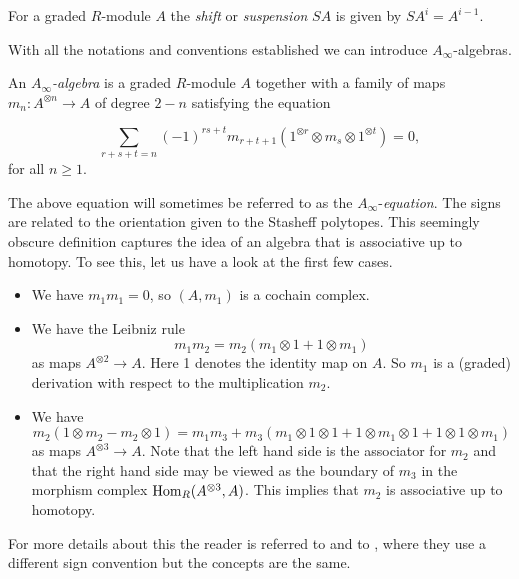\documentclass[Thesis.tex]{subfiles}
\begin{document}
\begin{defin}
For a graded $R$-module $A$ the \emph{shift} or \emph{suspension} $SA$ is given by $SA^i=A^{i-1}$. %
\end{defin}

With all the notations and conventions established we can introduce $A_\infty$-algebras. 

\begin{defin}\label{ainftyalgebra}
An \emph{$A_\infty$-algebra} is a graded $R$-module $A$ together with a family of maps $m_n:A^{\otimes n}\to A$ of degree $2-n$ satisfying the equation

\begin{equation}\label{ainftyequation}
\sum_{r+s+t=n}(-1)^{rs+t}m_{r+t+1}(1^{\otimes r}\otimes m_s\otimes 1^{\otimes t})=0,
\end{equation}
for all $n\geq 1$.
\end{defin}
The above equation will sometimes be referred to as the $A_\infty$-\emph{equation}. The signs are related to the orientation given to the Stasheff polytopes. This seemingly obscure definition captures the idea of an algebra that is associative up to homotopy. To see this, let us have a look at the first few cases.

\begin{itemize}
\item We have $m_1m_1=0$, so $(A, m_1)$ is a cochain complex.
\item We have the Leibniz rule
\[
m_1 m_2 = m_2 (m_1 \otimes 1 + 1 \otimes m_1)
\]
as maps $A^{\otimes 2}\to A$. Here 1 denotes the identity map on $A$. So $m_1$ is
a (graded) derivation with respect to the multiplication $m_2$.
\item We have
\[
m_2(1\otimes m_2 − m_2\otimes 1)= m_1m_3 + m_3 (m_1\otimes 1\otimes 1 + 1\otimes m_1\otimes 1 + 1\otimes 1\otimes m_1)
\]
as maps $A^{\otimes 3}\to A$. Note that the left hand side is the associator for $m_2$ and
that the right hand side may be viewed as the boundary of $m_3$ in the morphism
complex $\operatorname{Hom}_R (A^{\otimes 3},A)$. This implies that $m_2$ is associative up to homotopy. 
\end{itemize}


 For more details about this the reader is referred to \cite{keller} and to \cite[\S 9.2]{lodayvallette}, where they use a different sign convention but the concepts are the same.
\end{document}

